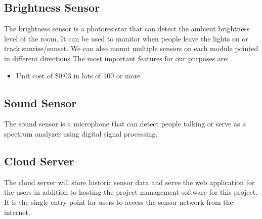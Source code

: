 		\subsection{Brightness Sensor}
			The brightness sensor is a photoresistor that can detect the ambient brightness level of the room. It can be used to monitor when people leave the lights on or track sunrise/sunset. We can also mount multiple sensors on each module pointed in different directions The most important features for our purposes are:
			\begin{itemize}
				\item Unit cost of \$0.03 in lots of 100 or more
			\end{itemize}
		
		\subsection{Sound Sensor}
			The sound sensor is a microphone that can detect people talking or serve as a spectrum analyzer using digital signal processing. %
			
		\subsection{Cloud Server}
			The cloud server will store historic sensor data and serve the web application for the users in addition to hosting the project management software for this project. It is the single entry point for users to access the sensor network from the internet.
		 
